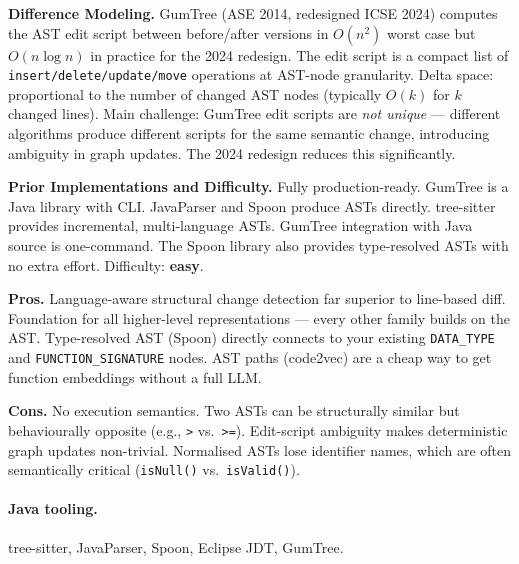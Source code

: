 \documentclass[12pt,a4paper]{article}
\begin{document}
\begin{diffbox}
\textbf{Difference Modeling.}
GumTree (ASE 2014, redesigned ICSE 2024) computes the AST edit script between
before/after versions in $O(n^2)$ worst case but $O(n \log n)$ in practice for
the 2024 redesign. The edit script is a compact list of
\texttt{insert/delete/update/move} operations at AST-node granularity.
Delta space: proportional to the number of changed AST nodes (typically
$O(k)$ for $k$ changed lines). Main challenge: GumTree edit scripts are
\emph{not unique} --- different algorithms produce different scripts for the
same semantic change, introducing ambiguity in graph updates. The 2024 redesign
reduces this significantly.
\end{diffbox}

\begin{implbox}
\textbf{Prior Implementations and Difficulty.}
Fully production-ready. GumTree is a Java library with CLI. JavaParser and
Spoon produce ASTs directly. tree-sitter provides incremental, multi-language
ASTs. GumTree integration with Java source is one-command. The Spoon library
also provides type-resolved ASTs with no extra effort. Difficulty: \textbf{easy}.
\end{implbox}

\begin{prosbox}
\textbf{Pros.}
Language-aware structural change detection far superior to line-based diff.
Foundation for all higher-level representations --- every other family builds
on the AST. Type-resolved AST (Spoon) directly connects to your existing
\texttt{DATA\_TYPE} and \texttt{FUNCTION\_SIGNATURE} nodes. AST paths
(code2vec) are a cheap way to get function embeddings without a full LLM.
\end{prosbox}

\begin{consbox}
\textbf{Cons.}
No execution semantics. Two ASTs can be structurally similar but behaviourally
opposite (e.g., \texttt{>} vs.\ \texttt{>=}). Edit-script ambiguity makes
deterministic graph updates non-trivial. Normalised ASTs lose identifier names,
which are often semantically critical (\texttt{isNull()} vs.\
\texttt{isValid()}).
\end{consbox}

\paragraph{Java tooling.} tree-sitter, JavaParser, Spoon, Eclipse JDT, GumTree.
\end{document}

